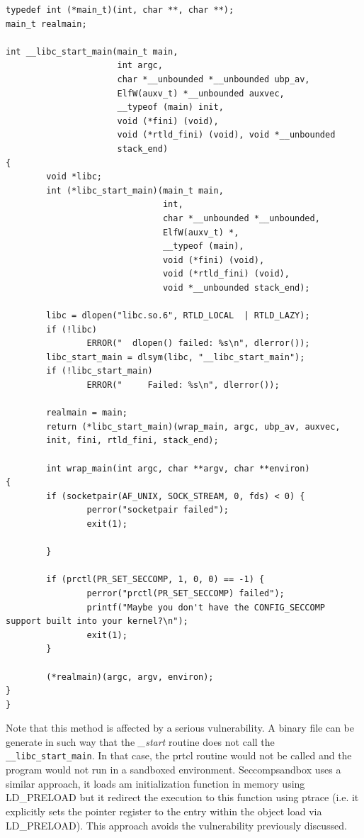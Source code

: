 \begin{center}
\label{preload}
\begin{lstlisting}[caption={Wrapper \_\_libc\_start\_main used in seccomp-nurse}]
typedef int (*main_t)(int, char **, char **);
main_t realmain;

int __libc_start_main(main_t main,
                      int argc,
                      char *__unbounded *__unbounded ubp_av,
                      ElfW(auxv_t) *__unbounded auxvec,
                      __typeof (main) init,
                      void (*fini) (void),
                      void (*rtld_fini) (void), void *__unbounded
                      stack_end)
{
        void *libc;
        int (*libc_start_main)(main_t main,
                               int,
                               char *__unbounded *__unbounded,
                               ElfW(auxv_t) *,
                               __typeof (main),
                               void (*fini) (void),
                               void (*rtld_fini) (void),
                               void *__unbounded stack_end);

        libc = dlopen("libc.so.6", RTLD_LOCAL  | RTLD_LAZY);
        if (!libc)
                ERROR("  dlopen() failed: %s\n", dlerror());
        libc_start_main = dlsym(libc, "__libc_start_main");
        if (!libc_start_main)
                ERROR("     Failed: %s\n", dlerror());

        realmain = main;
        return (*libc_start_main)(wrap_main, argc, ubp_av, auxvec,
        init, fini, rtld_fini, stack_end);
        
 		int wrap_main(int argc, char **argv, char **environ)
{
		if (socketpair(AF_UNIX, SOCK_STREAM, 0, fds) < 0) {
			    perror("socketpair failed");
                exit(1);
		
		}

        if (prctl(PR_SET_SECCOMP, 1, 0, 0) == -1) {
                perror("prctl(PR_SET_SECCOMP) failed");
                printf("Maybe you don't have the CONFIG_SECCOMP support built into your kernel?\n");
                exit(1);
        }

        (*realmain)(argc, argv, environ);
}       
}
\end{lstlisting}
\end{center}

Note that this method is affected by a serious vulnerability. A binary file can be generate in such way that the \emph{\_start} routine does not call the \lstinline$__libc_start_main$. In that case, the prtcl routine would not be called and the program would not run in a sandboxed environment. Seccompsandbox uses a similar approach, it loads am initialization function in memory using LD\_PRELOAD but it redirect the execution to this function using ptrace (i.e. it explicitly sets the pointer register to the entry within the object load via LD\_PRELOAD). This approach avoids the vulnerability previously discussed.  

